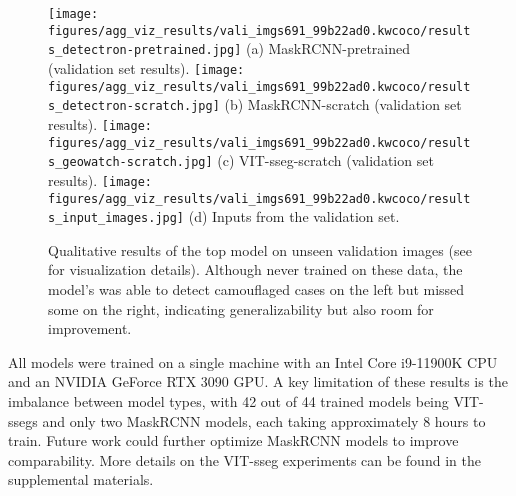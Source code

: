 \documentclass{article}
\begin{document}
\begin{figure*}[t]
\centering
\texttt{[image: figures/agg\_viz\_results/vali\_imgs691\_99b22ad0.kwcoco/results\_detectron-pretrained.jpg]}%
\hfill
(a) MaskRCNN-pretrained (validation set results).
\texttt{[image: figures/agg\_viz\_results/vali\_imgs691\_99b22ad0.kwcoco/results\_detectron-scratch.jpg]}%
\hfill
(b) MaskRCNN-scratch (validation set results).
\texttt{[image: figures/agg\_viz\_results/vali\_imgs691\_99b22ad0.kwcoco/results\_geowatch-scratch.jpg]}%
\hfill
(c) VIT-sseg-scratch (validation set results).
\texttt{[image: figures/agg\_viz\_results/vali\_imgs691\_99b22ad0.kwcoco/results\_input\_images.jpg]}%
\hfill
(d) Inputs from the validation set.
\caption[]{
Qualitative results of the top model on unseen validation images (see  for visualization details). Although never trained on these data, the model's was able to detect camouflaged cases on the left but missed some on the right, indicating generalizability but also room for improvement.}
\label{fig:vali_results_all_models}
\end{figure*}


All models were trained on a single machine with an Intel Core i9-11900K CPU and an NVIDIA GeForce RTX 3090
  GPU.
A key limitation of these results is the imbalance between model types, with 42 out of 44 trained models
  being VIT-ssegs and only two MaskRCNN models, each taking approximately 8 hours to train.
Future work could further optimize MaskRCNN models to improve comparability.
More details on the VIT-sseg experiments can be found in the supplemental materials.
\end{document}
